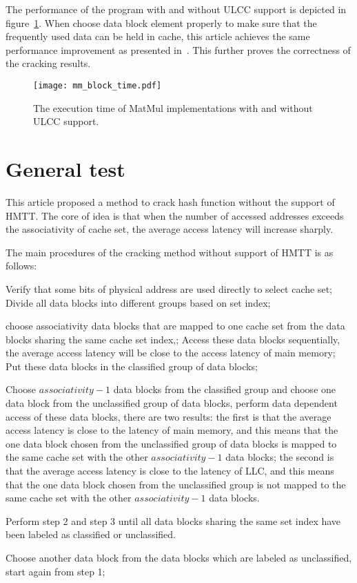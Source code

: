 \documentclass[conference]{IEEEtran}
\newcommand{\Associativity}{associativity }
\begin{document}
The performance of the program with and without ULCC support is depicted in figure~\ref{fig:MMBlockTime}. When choose data block element properly to make sure that the frequently used data can be held in cache, this article achieves the same performance improvement as presented in~\cite{ding2011ulcc}. This further proves the correctness of the cracking results.
\begin{figure}[!htp]
\centering
\texttt{[image: mm\_block\_time.pdf]}
\caption{The execution time of MatMul implementations with and without ULCC support.}
\label{fig:MMBlockTime}
\end{figure}
\section{General test}
This article proposed a method to crack hash function without the support of HMTT. The core of idea is that when the number of accessed addresses exceeds the associativity of cache set, the average access latency will increase sharply.

The main procedures of the cracking method without support of HMTT is as follows:
\begin{inparaenum}[(1)]
\item Verify that some bits of physical address are used directly to select cache set; Divide all data blocks into different groups based on set index;
\item  choose \Associativity data blocks that are mapped to one cache set from the data blocks sharing the same cache set index,; Access these data blocks sequentially, the average access latency will be close to the access latency of main memory; Put these data blocks in the classified group of data blocks;
\item Choose $\Associativity - 1$ data blocks from the classified group and choose one data block from the unclassified group of data blocks, perform data dependent access of these data blocks, there are two results: the first is that the average access latency is close to the latency of main memory, and this means that the one data block chosen from the unclassified group of data blocks is mapped to the same cache set with the other $\Associativity - 1$ data blocks; the second is that the average access latency is close to the latency of LLC, and this means that the one data block chosen from the unclassified group is not mapped to the same cache set with the other $\Associativity - 1$ data blocks.
\item Perform step 2 and step 3 until all data blocks sharing the same set index have been labeled as classified or unclassified.
\item Choose another data block from the data blocks which are labeled as unclassified, start again from step 1;	
\end{inparaenum}
\end{document}
